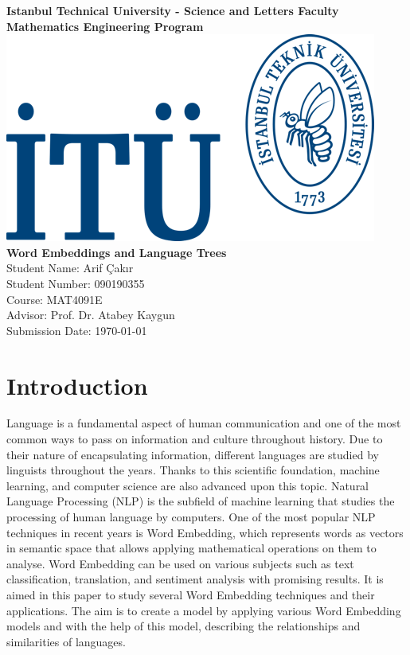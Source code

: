 \documentclass[man]{apa7}
\begin{document}
\begin{titlepage}
\centering
{\large \textbf{ Istanbul Technical University - Science and Letters Faculty}}\\
{\large \textbf{Mathematics Engineering Program}}\\[4\baselineskip]
\includegraphics[scale = 1.5]{itülogo.png}\\[6\baselineskip]
{\LARGE \textbf{Word Embeddings and Language Trees}}\\[2\baselineskip]

{\Large Student Name: Arif Çakır}\\
{\large Student Number: 090190355}\\
{\large Course: MAT4091E}\\
{\large Advisor: Prof. Dr. Atabey Kaygun}\\
{\large Submission Date: \today}\\
\end{titlepage}
\tableofcontents
\pagebreak

\section{Introduction}
Language is a fundamental aspect of human communication and one of the most common ways to pass on information and culture throughout history. Due to their nature of encapsulating information, different languages are studied by linguists throughout the years. Thanks to this scientific foundation, machine learning, and computer science are also advanced upon this topic. Natural Language Processing (NLP) is the subfield of machine learning that studies the processing of human language by computers. One of the most popular NLP techniques in recent years is Word Embedding, which represents words as vectors in semantic space that allows applying mathematical operations on them to analyse. Word Embedding can be used on various subjects such as text classification, translation, and sentiment analysis with promising results. It is aimed in this paper to study several Word Embedding techniques and their applications. The aim is to create a model by applying various Word Embedding models and with the help of this model, describing the relationships and similarities of languages.
\end{document}
